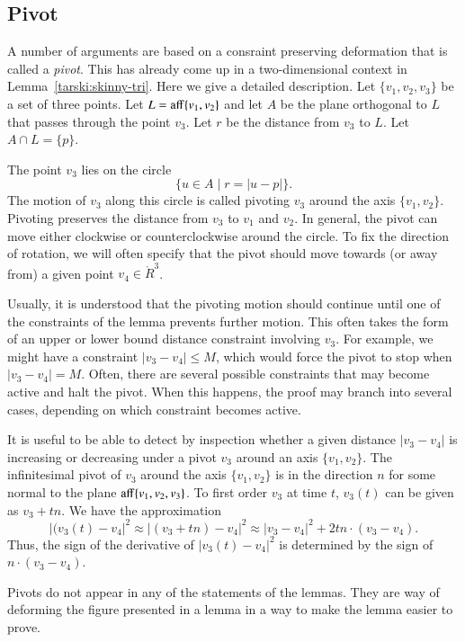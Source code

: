 \begin{tarskidata}
\section{Pivot}

A number of arguments are based on a consraint preserving deformation
that is called a {\it pivot}.   This has already come up in a two-dimensional
context in Lemma~\ref{tarski:skinny-tri}.  Here we give a detailed description. 
Let $\{v_1,v_2,v_3\}$ be a set
of three points.  Let $L={\operatorname{aff}}\{v_1,v_2\}$ and let $A$ be
the plane orthogonal to $L$ that passes through the point $v_3$.
Let $r$ be the distance from $v_3$ to $L$.  Let $A\cap L = \{p\}$.

The point $v_3$ lies on the circle
   $$
   \{u \in A \mid r = |u - p|\}.
   $$
The motion of $v_3$ along this circle is called pivoting $v_3$
around the axis $\{v_1,v_2\}$.   Pivoting preserves the distance from
$v_3$ to $v_1$ and $v_2$.   In general, the pivot can move
either clockwise or counterclockwise around the circle.  To fix
the direction of rotation, we will often specify that the pivot
should move towards (or away from) a given point $v_4\in\ring{R}^3$.



Usually, it is understood that the pivoting motion should continue
until one of the constraints of the lemma prevents further motion.
This often takes the form of an upper or lower bound distance
constraint involving $v_3$.  For example, we might have a constraint
$|v_3-v_4|\le M$, which would force the pivot to stop when $|v_3-v_4|=M$.
Often, there are several possible constraints that may become active
and halt the pivot.  When this happens, the proof may branch into several
cases, depending on which constraint becomes active.

It is useful to be able to detect by inspection whether a given
distance $|v_3-v_4|$ is increasing or decreasing under a pivot $v_3$
around an axis $\{v_1,v_2\}$.   The infinitesimal pivot of $v_3$ 
around the axis $\{v_1,v_2\}$ is in the direction $n$ for some normal
to the plane
${\operatorname{aff}}\{v_1,v_2,v_3\}$. 
To first order $v_3$ at time $t$, $v_3(t)$ can be given as $v_3+t n$.
We have the approximation
  $$
  |(v_3(t)-v_4|^2 \approx |(v_3+t n)-v_4|^2 
  \approx |v_3-v_4|^2 + 2 t n \cdot (v_3-v_4).
  $$
Thus, the sign of the derivative of $|v_3(t)-v_4|^2$ is determined by the
sign of $n\cdot (v_3-v_4)$.


Pivots do not appear in any of the statements of the lemmas.  They
are way of deforming the figure presented in a lemma in a way to make
the lemma easier to prove.








\end{tarskidata}
